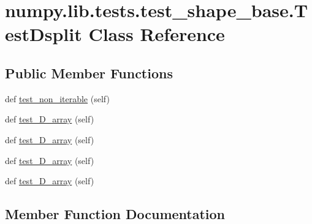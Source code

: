 \hypertarget{classnumpy_1_1lib_1_1tests_1_1test__shape__base_1_1TestDsplit}{}\section{numpy.\+lib.\+tests.\+test\+\_\+shape\+\_\+base.\+Test\+Dsplit Class Reference}
\label{classnumpy_1_1lib_1_1tests_1_1test__shape__base_1_1TestDsplit}
\subsection*{Public Member Functions}
\begin{DoxyCompactItemize}
\item 
def \hyperlink{classnumpy_1_1lib_1_1tests_1_1test__shape__base_1_1TestDsplit_a9e8021aaa64e99675845bae2774d5061}{test\+\_\+non\+\_\+iterable} (self)
\item 
def \hyperlink{classnumpy_1_1lib_1_1tests_1_1test__shape__base_1_1TestDsplit_ac75048e70941cd5e3b5c974cc5bd7383}{test\+\_\+D\+\_\+array} (self)
\item 
def \hyperlink{classnumpy_1_1lib_1_1tests_1_1test__shape__base_1_1TestDsplit_ad7c624a160644c79f4b2f63c8536195f}{test\+\_\+D\+\_\+array} (self)
\item 
def \hyperlink{classnumpy_1_1lib_1_1tests_1_1test__shape__base_1_1TestDsplit_aed52f4afd4779b56fdf22b113ccbbe5e}{test\+\_\+D\+\_\+array} (self)
\item 
def \hyperlink{classnumpy_1_1lib_1_1tests_1_1test__shape__base_1_1TestDsplit_a7a8b5c8385959ad5e82db541460e0af0}{test\+\_\+D\+\_\+array} (self)
\end{DoxyCompactItemize}


\subsection{Member Function Documentation}
\mbox{\label{classnumpy_1_1lib_1_1tests_1_1test__shape__base_1_1TestDsplit_ac75048e70941cd5e3b5c974cc5bd7383}} 
